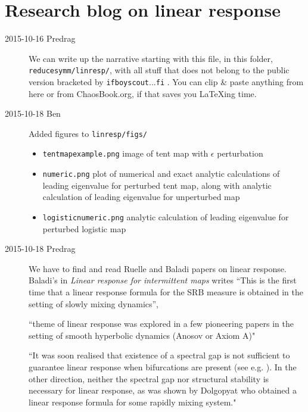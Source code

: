 
	
\chapter{Research blog on linear response}
\label{c-DailyBlog}

\begin{description}

\item[2015-10-16 Predrag] We can write up the narrative starting with
    this file, in this folder, \texttt{reducesymm/linresp/}, with all
    stuff that does not belong to the public version bracketed by
    \texttt{ifboyscout}...\texttt{fi} . You can clip \& paste anything
    from here or from ChaosBook.org, if that saves you LaTeXing time.

\item[2015-10-18 Ben] Added figures to \texttt{linresp/figs/}
\begin{itemize}
  \item \texttt{tentmapexample.png}
    image of tent map with $\epsilon$ perturbation
  \item \texttt{numeric.png}
    plot of numerical and exact analytic calculations of leading
    eigenvalue for perturbed tent map, along with analytic
    calculation of leading eigenvalue for unperturbed map
  \item \texttt{logisticnumeric.png}
    analytic calculation of leading eigenvalue for perturbed
    logistic map
\end{itemize}

\item[2015-10-18 Predrag]
We have to find and read Ruelle and
Baladi papers on linear response. Baladi's in
{\em Linear response for intermittent maps} writes ``This is the first
time that a linear response formula for the SRB measure is obtained in
the setting of slowly mixing dynamics'',

``theme of linear response was explored in a few pioneering
papers in the setting of smooth hyperbolic
dynamics (Anosov or Axiom A)"

``It was soon realised that existence of a spectral gap is not sufficient
to guarantee linear response when bifurcations are present (see e.g.
). In the other direction, neither the
spectral gap nor structural stability is necessary for linear response,
as was shown by Dolgopyat who obtained a linear response
formula for some rapidly mixing system."


\end{description}
